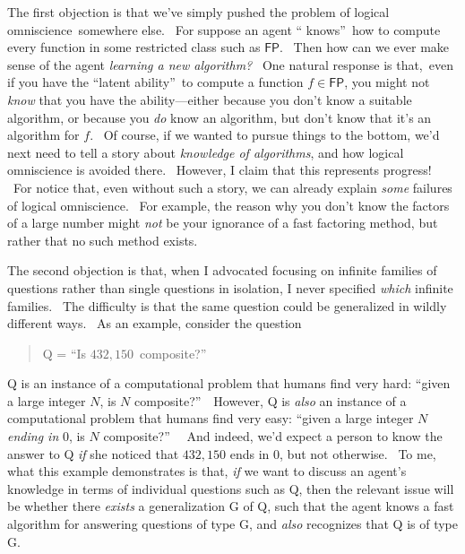 \documentclass[11pt,onecolumn]{article}%
\begin{document}
The first objection is that we've simply pushed the problem of logical
omniscience\ somewhere else. \ For suppose an agent \textquotedblleft
knows\textquotedblright\ how to compute every function in some restricted
class such as $\mathsf{FP}$. \ Then how can we ever make sense of the agent
\textit{learning a new algorithm?} \ One natural response is that,\ even if
you have the \textquotedblleft latent ability\textquotedblright\ to compute a
function $f\in\mathsf{FP}$, you might not \textit{know} that you have the
ability---either because you don't know a suitable algorithm, or because you
\textit{do} know an algorithm, but don't know that it's an algorithm for $f$.
\ Of course, if we wanted to pursue things to the bottom, we'd next need to
tell a story about \textit{knowledge of algorithms}, and how logical
omniscience is avoided there. \ However, I claim that this represents
progress! \ For notice that, even without such a story, we can already explain
\textit{some} failures of logical omniscience. \ For example, the reason why
you don't know the factors of a large number might \textit{not} be your
ignorance of a fast factoring method, but rather that no such method exists.

The second objection is that, when I advocated focusing on infinite families
of questions rather than single questions in isolation, I never specified
\textit{which} infinite families. \ The difficulty is that the same question
could be generalized in wildly different ways. \ As an example, consider the question

\begin{quotation}
\noindent Q = \textquotedblleft Is $432,150$\ composite?\textquotedblright
\end{quotation}

\noindent Q is an instance of a computational problem that humans find very
hard: \textquotedblleft given a large integer $N$, is $N$
composite?\textquotedblright\ \ However, Q is \textit{also} an instance of a
computational problem that humans find very easy: \textquotedblleft given a
large integer $N$ \textit{ending in} $0$, is $N$ composite?\textquotedblright%
\ \ And indeed, we'd expect a person to know the answer to Q \textit{if} she
noticed that $432,150$ ends in $0$, but not otherwise. \ To me, what this
example demonstrates is that, \textit{if} we want to discuss an agent's
knowledge in terms of individual questions such as Q, then the relevant issue
will be whether there \textit{exists} a generalization G of Q, such that the
agent knows a fast algorithm for answering questions of type G, and
\textit{also} recognizes that Q is of type G.
\end{document}
